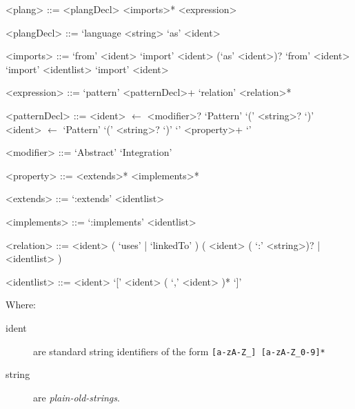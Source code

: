 
\usepackage{syntax}


\maketitle

\begin{grammar}
<plang> ::= <plangDecl> <imports>* <expression>


<plangDecl> ::= `language <string> `as' <ident>


<imports> ::= `from' <ident> `import' <ident> (`as' <ident>)?
  \alt `from' <ident> `import' <identlist>
  \alt `import' <ident>


<expression> ::= `pattern' <patternDecl>+ `relation' <relation>*

<patternDecl> ::= <ident> $\leftarrow$ <modifier>? `Pattern' `(' <string>? `)'
\alt <ident> $\leftarrow$ `Pattern' `(' <string>? `)' `{' <property>+ `}'

<modifier> ::= `Abstract' \alt `Integration'

<property> ::= <extends>* <implements>*

<extends> ::= `:extends' <identlist>

<implements> ::= `:implements' <identlist>

<relation> ::= <ident> ( `uses' | `linkedTo' ) ( <ident> ( `:' <string>)? | <identlist> )

<identlist> ::= <ident>  \alt `[' <ident> ( `,' <ident> )* `]'

\end{grammar}

\noindent
Where:

\begin{description}
\item[ident]
are standard string identifiers of the form \verb+[a-zA-Z_] [a-zA-Z_0-9]*+

\item[string]
are \emph{plain-old-strings}.
\end{description}

